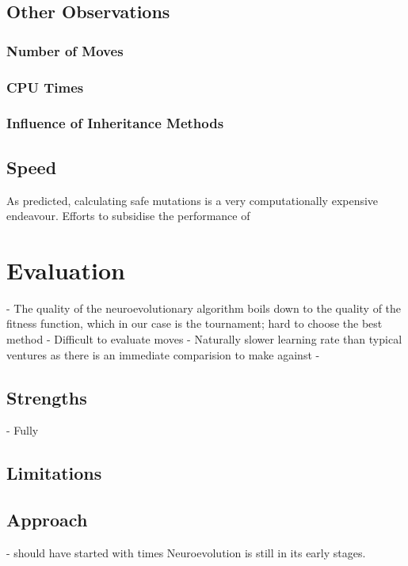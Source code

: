 \documentclass[12pt,a4paper]{article}
\begin{document}
    \subsection{Other Observations}
        \subsubsection{Number of Moves}
        \subsubsection{CPU Times}
        \subsubsection{Influence of Inheritance Methods}
    \subsection{Speed}
    
    As predicted, calculating safe mutations is a very computationally expensive endeavour. Efforts to subsidise the performance of 


\section{Evaluation}
    - The quality of the neuroevolutionary algorithm boils down to the quality of the fitness function, which in our case is the tournament; hard to choose the best method
    - Difficult to evaluate moves
    - Naturally slower learning rate than typical ventures as there is an immediate comparision to make against
    - 
    \subsection{Strengths}
    - Fully
    \subsection{Limitations}
    \subsection{Approach}
    - should have started with times
    Neuroevolution is still in its early stages.
\end{document}
